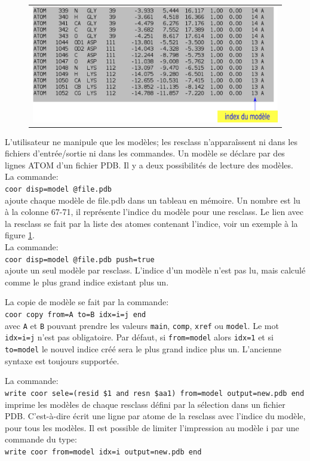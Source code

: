    \begin{figure}[!htbp]
     \centering
     \begin{tabular}{c}
       \includegraphics[width=12cm]{figure/PDB.png} 
     \end{tabular}     
     \caption{\textbt{}}
\label{fig:PDB}
   \end{figure}


L'utilisateur ne manipule que les modèles; les resclass n'apparaîssent ni dans les fichiers d'entrée/sortie ni dans les commandes. Un modèle se déclare par des lignes ATOM d'un fichier PDB. Il y a deux possibilités de lecture des modèles.\\
La commande:\\
\verb!coor disp=model @file.pdb!\\
ajoute chaque modèle de file.pdb dans un tableau en mémoire. Un nombre est lu à la colonne 67-71, il représente l'indice du modèle pour une resclass. Le lien avec la resclass se fait par la liste des atomes contenant l'indice, voir un exemple à la figure \ref{fig:PDB}.\\
La commande:\\
\verb!coor disp=model @file.pdb push=true!\\
ajoute un seul modèle par resclass. L'indice d'un modèle n'est pas lu, mais calculé comme le plus grand indice existant plus un. 

La copie de modèle se fait par la commande:\\
\verb!coor copy from=A to=B idx=i=j end!\\
avec \verb!A! et \verb!B!  pouvant prendre les valeurs \verb!main!, \verb!comp!, \verb!xref! ou \verb!model!.
Le mot \verb!idx=i=j! n'est pas obligatoire. Par défaut, si \verb!from=model! alors \verb!idx=1! et si \verb!to=model! le nouvel indice créé sera le plus grand indice plus un. L'ancienne syntaxe est toujours supportée.

La commande:\\ 
\verb!write coor sele=(resid $1 and resn $aa1) from=model output=new.pdb end!\\
imprime les modèles de chaque resclass défini par la sélection dans un fichier PDB. C'est-à-dire écrit une ligne par atome de la resclass avec l'indice du modèle, pour tous les modèles. 
Il est possible de limiter l'impression au modèle i par une commande du type:\\
\verb!write coor from=model idx=i output=new.pdb end!\\


